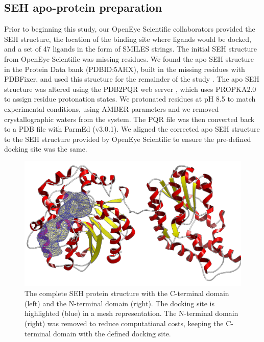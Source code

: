 \subsection{SEH apo-protein preparation}
Prior to beginning this study, our OpenEye Scientific collaborators provided the SEH structure, the location of the binding site where ligands would be docked, and a set of 47 ligands in the form of SMILES strings.
The initial SEH structure from OpenEye Scientific was missing residues.
We found the apo SEH structure in the Protein Data bank (PDBID:5AHX), built in the missing residues with PDBFixer, and used this structure for the remainder of the study \cite{noauthor_pdbfixer_2019}.
The apo SEH structure was altered using the PDB2PQR web server \cite{pdb2pqr}, which uses PROPKA2.0 to assign residue protonation states.
We protonated residues at pH 8.5 to match experimental conditions, using AMBER parameters \cite{jurrus_improvements_2018,sondergaard_improved_2011,noauthor_propka3:_nodate} and we removed crystallographic waters from the system.
The PQR file was then converted back to a PDB file with ParmEd (v3.0.1).
We aligned the corrected apo SEH structure to the SEH structure provided by OpenEye Scientific to ensure the pre-defined docking site was the same.

\begin{figure}
    \centering
    \includegraphics{chapter6/Figures/fullprotein.png}
    \caption[SEH Complete Protein]{The complete SEH protein structure with the C-terminal domain (left) and the N-terminal domain (right). The docking site is highlighted (blue) in a mesh representation. The N-terminal domain (right) was removed to reduce computational costs, keeping the C-terminal domain with the defined docking site.}
    \label{fig:full-protein}
\end{figure}

